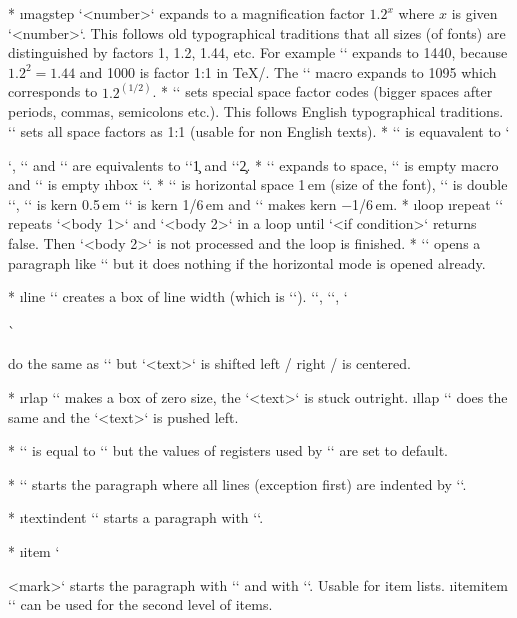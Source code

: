 {\begitems
* \i magstep `\magstep<number>` expands to a magnification factor $1.2^x$ where $x$ is
  given `<number>`. This follows old typographical traditions that all sizes
  (of fonts) are distinguished by factors 1, 1.2, 1.44, etc.
  For example `` expands to 1440, because $1.2^2=1.44$ 
  and 1000 is factor 1:1 in \TeX/. The \x`\magstephalf` macro expands to
  1095 which corresponds to $1.2^{(1/2)}$.
* \x`\nonfrenchspacing` sets special space factor codes (bigger spaces after
  periods, commas, semicolons etc.). This follows English typographical
  traditions. \x`\frenchspacing` sets all space factors as 1:1 (usable for non
  English texts). 
* \x`\endgraf` is equavalent to \x`\par`, \x`\bgroup` and \x`\egroup` are
  equivalents to `{`\c1 and `}`\c2.
* \x`\space` expands to space, \x`\empty` is empty macro and \x`\null` is empty
  \i hbox `\hbox{}`.
* \x`\quad` is horizontal space 1\,em (size of the font), \x`\qquad` is
  double `\quad`,
  \x`\enspace` is kern 0.5\,em \x`\thinspace` is kern 1/6\,em and 
  \x`\negthinspace` makes kern $-$1/6\,em.
* \i loop \i repeat `\repeat`
  repeats `<body 1>` and `<body 2>` in a loop until `<if condition>` returns
  false. Then `<body 2>` is not processed and the loop is finished.
* \x`\leavevmode` opens a paragraph like `\indent` but it does nothing if
  the horizontal mode is opened already.

* \i line `` creates a box of line width (which is \x`\hsize`). 
  \x`\leftline`, \x`\rightline`, \x`\centerline` do the same as 
  `\line` but `<text>` is shifted left / right / is centered.

* \i rlap `` makes a box of zero size, the `<text>` is stuck
  outright. \i llap `` does the same and the `<text>` is pushed
  left. 

* \x`\ialign` is equal to `\halign` but the values of registers used by
  `\halign` are set to default.

* \x`\hang` starts the paragraph where all lines (exception first) are
  indented by `\parindent`.

* \i textindent `` starts a paragraph with ``. 

* \i item `\item{<mark>}` starts the paragraph with `\hang` and with
  ``. Usable for item lists.
  \i itemitem `` can be used for the second level of items.

}
